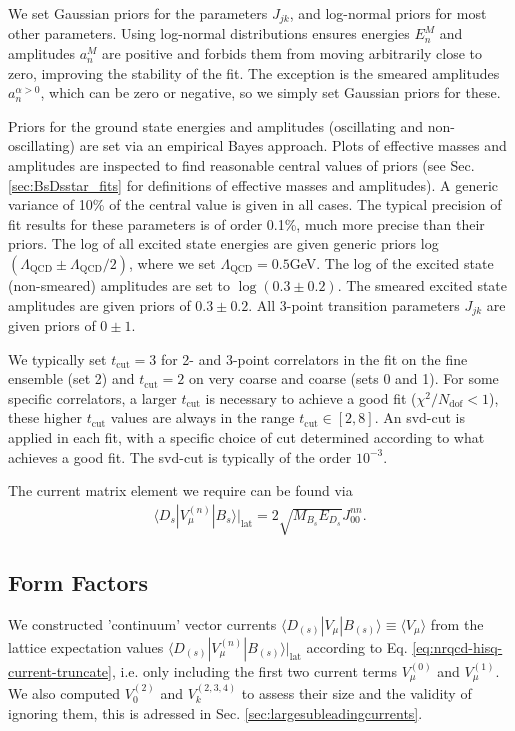 We set Gaussian priors for the parameters $J_{jk}$, and log-normal priors for most other parameters. Using log-normal distributions ensures energies $E_n^M$ and amplitudes $a_n^M$ are positive and forbids them from moving arbitrarily close to zero, improving the stability of the fit. The exception is the smeared amplitudes $a^{\alpha>0}_n$, which can be zero or negative, so we simply set Gaussian priors for these.

Priors for the ground state energies and amplitudes (oscillating and non-oscillating) are set via an empirical Bayes approach. Plots of effective masses and amplitudes are inspected to find reasonable central values of priors (see Sec. \ref{sec:BsDsstar_fits} for definitions of effective masses and amplitudes). A generic variance of 10\% of the central value is given in all cases. The typical precision of fit results for these parameters is of order 0.1\%, much more precise than their priors. The log of all excited state energies are given generic priors log$(\Lambda_{\text{QCD}}\pm\Lambda_{\text{QCD}}/2)$, where we set $\Lambda_{\text{QCD}}=0.5$GeV. The log of the excited state (non-smeared) amplitudes are set to $\log(0.3\pm 0.2)$. The smeared excited state amplitudes are given priors of  $0.3\pm 0.2$. All 3-point transition parameters $J_{jk}$ are given priors of $0\pm 1$.

We typically set $t_{\text{cut}}=3$ for 2- and 3-point correlators in the fit on the fine ensemble (set 2) and $t_{\text{cut}}=2$ on very coarse and coarse (sets 0 and 1). For some specific correlators, a larger $t_{\text{cut}}$ is necessary to achieve a good fit ($\chi^2/N_{\text{dof}} < 1$), these higher $t_{\text{cut}}$ values are always in the range $t_{\text{cut}}\in[2,8]$. An svd-cut is applied in each fit, with a specific choice of cut determined according to what achieves a good fit. The svd-cut is typically of the order $10^{-3}$.

The current matrix element we require can be found via
\begin{align}
  \langle D_s | V_{\mu}^{(n)} | B_s \rangle |_{\text{lat}} = 2 \sqrt{M_{B_s}E_{D_s}} J^{nn}_{00}.
  \label{eq:currentfit}
\end{align}

\subsection{Form Factors}

We constructed 'continuum' vector currents $\langle D_{(s)}| V_{\mu} | B_{(s)} \rangle \equiv \langle V_{\mu} \rangle$ from the lattice expectation values $\langle D_{(s)} | V_{\mu}^{(n)} | B_{(s)} \rangle |_{\text{lat}}$ according to Eq. \eqref{eq:nrqcd-hisq-current-truncate}, i.e. only including the first two current terms $V^{(0)}_{\mu}$ and $V^{(1)}_{\mu}$. We also computed $V^{(2)}_{0}$ and $V^{(2,3,4)}_k$ to assess their size and the validity of ignoring them, this is adressed in Sec. \ref{sec:largesubleadingcurrents}.


